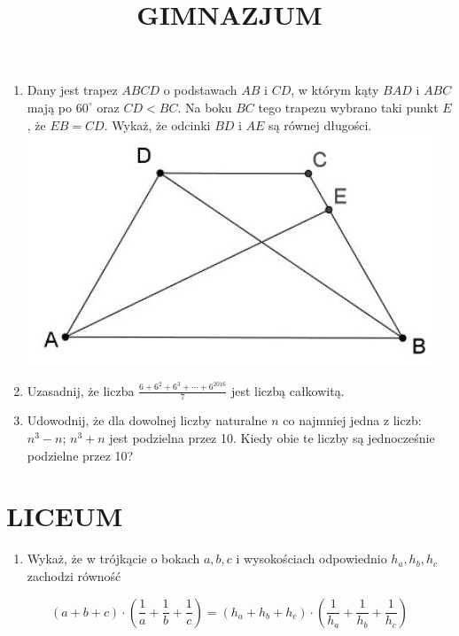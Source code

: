 \documentclass[10pt]{article}
\title{GIMNAZJUM }
\author{}
\date{}
\begin{document}
\maketitle
\begin{enumerate}
  \item Dany jest trapez \(A B C D\) o podstawach \(A B\) i \(C D\), w którym kąty \(B A D\) i \(A B C\) mają po \(60^{\circ}\) oraz \(C D<B C\). Na boku \(B C\) tego trapezu wybrano taki punkt \(E\), że \(E B=C D\). Wykaż, że odcinki \(B D\) i \(A E\) są równej długości.\\
\includegraphics[max width=\textwidth, center]{2024_11_21_913e907bded18b80a017g-1(1)}
  \item Uzasadnij, że liczba \(\frac{6+6^{2}+6^{3}+\cdots+6^{2016}}{7}\) jest liczbą całkowitą.
  \item Udowodnij, że dla dowolnej liczby naturalne \(n\) co najmniej jedna z liczb: \(n^{3}-n\); \(n^{3}+n\) jest podzielna przez 10. Kiedy obie te liczby są jednocześnie podzielne przez 10?
\end{enumerate}

\section*{LICEUM}
\begin{enumerate}
  \item Wykaż, że w trójkącie o bokach \(a, b, c\) i wysokościach odpowiednio \(h_{a}, h_{b}, h_{c}\) zachodzi równość
\end{enumerate}

\[
(a+b+c) \cdot\left(\frac{1}{a}+\frac{1}{b}+\frac{1}{c}\right)=\left(h_{a}+h_{b}+h_{c}\right) \cdot\left(\frac{1}{h_{a}}+\frac{1}{h_{b}}+\frac{1}{h_{c}}\right)
\]
\end{document}
